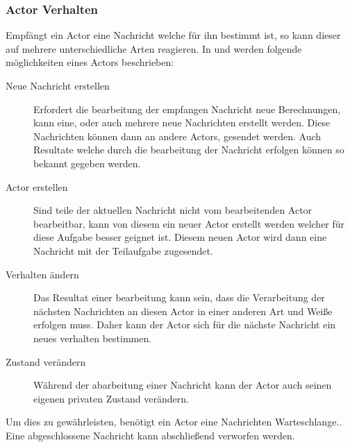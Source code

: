 \subsubsection{Actor Verhalten}
\label{actorBehaviour}
Empfängt ein Actor eine Nachricht welche für ihn bestimmt ist, so kann dieser auf mehrere unterschiedliche Arten reagieren. In \citep{Agha1985ActorsSystems} und \citep{Vernon2015ReactiveAkka} werden folgende möglichkeiten eines Actors beschrieben:
\begin{description}
    \item[Neue Nachricht erstellen] Erfordert die bearbeitung der empfangen Nachricht neue Berechnungen, kann eine, oder auch mehrere neue Nachrichten erstellt werden. Diese Nachrichten können dann an andere Actors, gesendet werden. Auch Resultate welche durch die bearbeitung der Nachricht erfolgen können so bekannt gegeben werden.
    \item[Actor erstellen] Sind teile der aktuellen Nachricht nicht vom bearbeitenden Actor bearbeitbar, kann von diesem ein neuer Actor erstellt werden welcher für diese Aufgabe besser geignet ist. Diesem neuen Actor wird dann eine Nachricht mit der Teilaufgabe zugesendet.
    \item[Verhalten ändern] Das Resultat einer bearbeitung kann sein, dass die Verarbeitung der nächsten Nachrichten an diesen Actor in einer anderen Art und Weiße erfolgen muss. Daher kann der Actor sich für die nächste Nachricht ein neues verhalten bestimmen.
    \item[Zustand verändern] Während der abarbeitung einer Nachricht kann der Actor auch seinen eigenen privaten Zustand verändern.
\end{description}

 Um dies zu gewährleisten, benötigt ein Actor eine Nachrichten Warteschlange.\citep{Agha1985ActorsSystems}. Eine abgeschlossene Nachricht kann abschließend verworfen werden. 

